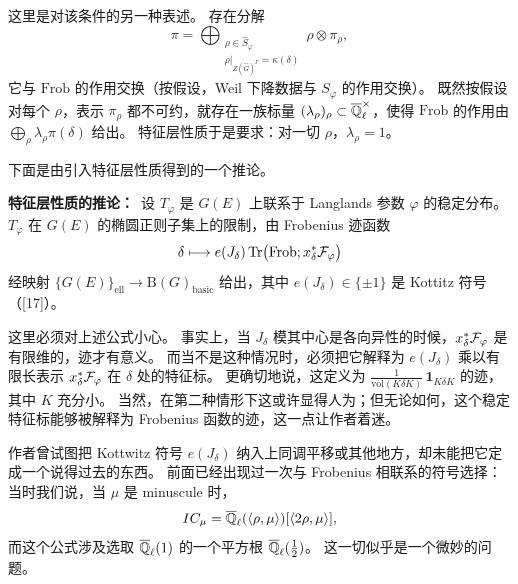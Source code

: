 这里是对该条件的另一种表述。
存在分解
\[
\pi=\bigoplus_{\substack{\rho\in\widehat{S}_\varphi\\ \rho|_{Z(\widehat{G})^\Gamma}=\kappa(\delta)}}
\rho\otimes\pi_\rho,
\]
它与 $\mathrm{Frob}$ 的作用交换（按假设，Weil 下降数据与 $S_\varphi$ 的作用交换）。
既然按假设对每个 $\rho$，表示 $\pi_\rho$ 都不可约，就存在一族标量 $(\lambda_\rho)_\rho\subset\overline{\mathbb{Q}}_\ell^\times$，使得 $\mathrm{Frob}$ 的作用由 $\bigoplus_\rho\lambda_\rho\pi(\delta)$ 给出。
特征层性质于是要求：对一切 $\rho$，$\lambda_\rho=1$。

下面是由引入特征层性质得到的一个推论。

\textbf{特征层性质的推论：}\ 设 $T_\varphi$ 是 $G(E)$ 上联系于 Langlands 参数 $\varphi$ 的稳定分布。
$T_\varphi$ 在 $G(E)$ 的椭圆正则子集上的限制，由 Frobenius 迹函数
\[
\delta\longmapsto e(J_\delta)\,\mathrm{Tr}\bigl(\mathrm{Frob};x_\delta^*\mathcal{F}_\varphi\bigr)
\]
经映射 $\{G(E)\}_{\mathrm{ell}}\to\mathrm{B}(G)_{\mathrm{basic}}$ 给出，其中 $e(J_\delta)\in\{\pm1\}$ 是 Kottitz 符号（[17]）。

这里必须对上述公式小心。
事实上，当 $J_\delta$ 模其中心是各向异性的时候，$x_\delta^*\mathcal{F}_\varphi$ 是有限维的，迹才有意义。
而当不是这种情况时，必须把它解释为 $e(J_\delta)$ 乘以有限长表示 $x_\delta^*\mathcal{F}_\varphi$ 在 $\delta$ 处的特征标。
更确切地说，这定义为 $\tfrac{1}{\mathrm{vol}(K\delta K)}\,\mathbf{1}_{K\delta K}$ 的迹，其中 $K$ 充分小。
当然，在第二种情形下这或许显得人为；但无论如何，这个稳定特征标能够被解释为 Frobenius 函数的迹，这一点让作者着迷。

\begin{remark}
作者曾试图把 Kottwitz 符号 $e(J_\delta)$ 纳入上同调平移或其他地方，却未能把它定成一个说得过去的东西。
前面已经出现过一次与 Frobenius 相联系的符号选择：当时我们说，当 $\mu$ 是 minuscule 时，
\[
IC_\mu=\overline{\mathbb{Q}}_\ell(\langle\rho,\mu\rangle)[\langle2\rho,\mu\rangle],
\]
而这个公式涉及选取 $\overline{\mathbb{Q}}_\ell(1)$ 的一个平方根 $\overline{\mathbb{Q}}_\ell(\tfrac12)$。
这一切似乎是一个微妙的问题。
\end{remark}

